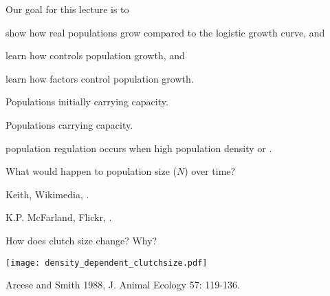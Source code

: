 \documentclass[t]{beamer}
\begin{document}

\begin{frame}{Our goal for this lecture is to}

	\hangpara show how real populations grow compared to the logistic growth curve, and
	
	\hangpara learn how  controls  population growth, and
	
	\hangpara learn how  factors control population growth.
	
\end{frame}
%
{
\begin{frame}{Populations initially  carrying capacity.}
\end{frame}
}
%
{
\begin{frame}{Populations  carrying capacity.}
\end{frame}
}

%
\begin{frame}{}

	\hangpara {} population regulation occurs when high population density  or .
	
	\hangpara What would happen to population size ($N$) over time?
	
\end{frame}
%
{
\begin{frame}[b]{}
\tiny\textcolor{gray!20!white}{Keith, Wikimedia, .}
\end{frame}
}

{
\begin{frame}[b]{}
\tiny\textcolor{gray!20!white}{K.P. McFarland, Flickr, .}
\end{frame}
}


\begin{frame}[b]{How does clutch size change? Why?}
	\begin{center}
		\texttt{[image: density\_dependent\_clutchsize.pdf]}
	\end{center}	

	\tiny Arcese and Smith 1988, J. Animal Ecology 57: 119-136.
\end{frame}
\end{document}
